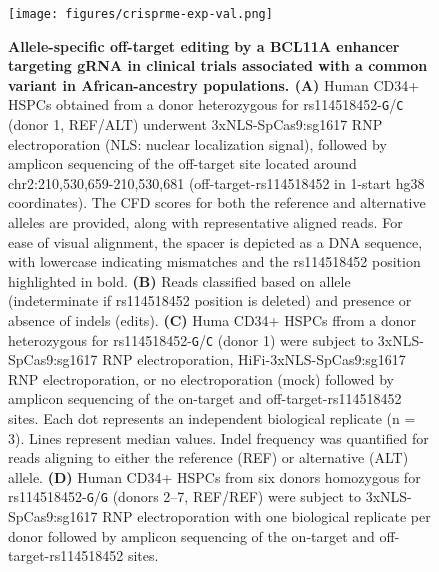 \documentclass[a4paper, titlepage, openright]{book}
\begin{document}
%
\begin{figure}[!]
	\centering
	\texttt{[image: figures/crisprme-exp-val.png]}
	\caption[Allele-specific off-target editing by a BCL11A enhancer targeting gRNA in clinical trials associated with a common variant in African-ancestry populations]{\textbf{Allele-specific off-target editing by a BCL11A enhancer targeting gRNA in clinical trials associated with a common variant in African-ancestry populations. (A)} Human CD34+ HSPCs obtained from a donor heterozygous for rs114518452-\texttt{G}/\texttt{C} (donor 1, REF/ALT) underwent 3xNLS-SpCas9:sg1617 RNP electroporation (NLS: nuclear localization signal), followed by amplicon sequencing of the off-target site located around chr2:210,530,659-210,530,681 (off-target-rs114518452 in 1-start hg38 coordinates). The CFD scores for both the reference and alternative alleles are provided, along with representative aligned reads. For ease of visual alignment, the spacer is depicted as a DNA sequence, with lowercase indicating mismatches and the rs114518452 position highlighted in bold. \textbf{(B)} Reads classified based on allele (indeterminate if rs114518452 position is deleted) and presence or absence of indels (edits). \textbf{(C)} Huma CD34+ HSPCs ffrom a donor heterozygous for rs114518452-\texttt{G}/\texttt{C} (donor 1) were subject to 3xNLS-SpCas9:sg1617 RNP electroporation,  HiFi-3xNLS-SpCas9:sg1617 RNP electroporation, or no electroporation (mock) followed by amplicon sequencing of the on-target and off-target-rs114518452 sites. Each dot represents an independent biological replicate (n = 3). Lines represent median values. Indel frequency was quantified for reads aligning to either the reference (REF) or alternative (ALT) allele. \textbf{(D)} Human CD34+ HSPCs from six donors homozygous for rs114518452-\texttt{G}/\texttt{G} (donors 2–7, REF/REF) were subject to 3xNLS-SpCas9:sg1617 RNP electroporation with one biological replicate per donor followed by amplicon sequencing of the on-target and off-target-rs114518452 sites.}
	\label{fig:crisprme-exp-val}
\end{figure}
%
\end{document}
